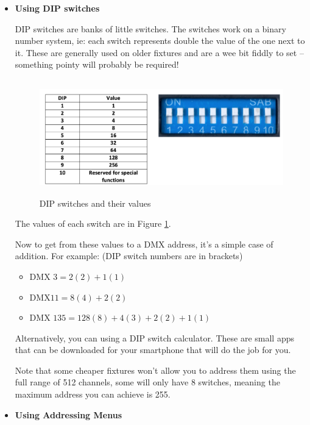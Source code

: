 \documentclass[14pt]{article} %
\begin{document}
\begin{itemize}

\item \textbf{Using DIP switches}

DIP switches are banks of little switches. The switches work on a binary number system, ie: each switch represents double the value of the one next to it. These are generally used on older fixtures and are a wee bit fiddly to set – something pointy will probably be required!

\begin{figure}[h]
\begin{center}

\includegraphics[height=5cm]{dip.png}
\caption{DIP switches and their values}
\label{fig:dip}

\end{center}
\end{figure}

The values of each switch are in Figure \ref{fig:dip}.

Now to get from these values to a DMX address, it’s a simple case of addition. For example:
(DIP switch numbers are in brackets)
\begin{itemize}
\item	DMX $3 		= 	2  (2)   +   1  (1)$
\item	DMX$ 11			= 	8  (4)   +   2  (2)$
\item	DMX $135 	=	128 (8)  +  4 (3)  +  2  (2)  +  1  (1)$
\end{itemize}

Alternatively, you can using a DIP switch calculator. These are small apps that can be downloaded for your smartphone that will do the job for you.

Note that some cheaper fixtures won’t allow you to address them using the full range of 512 channels, some will only have 8 switches, meaning the maximum address you can achieve is 255.

\item \textbf{Using Addressing Menus}


\end{itemize}
\end{document}
